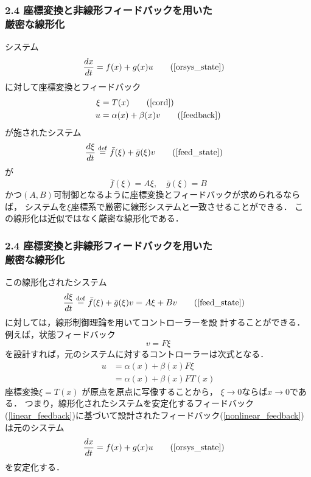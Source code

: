 \begin{frame}[t]
\frametitle{2.4 座標変換と非線形フィードバックを用いた\\
厳密な線形化}
システム
\begin{align}
 \frac{dx}{dt} &= f(x) + g(x) u \tag{\ref{orsys_state}}
 \end{align}
に対して座標変換とフィードバック
\begin{align}
 \xi &= T(x) \tag{\ref{cord}} \\
 u   &= \alpha (x) + \beta (x) v
  \tag{\ref{feedback}}
\end{align}
が施されたシステム
\begin{align}
 \frac{d \xi}{dt} 
 &\defeq \bar{f}(\xi) + \bar{g}(\xi) v
  \tag{\ref{feed_state}}
\end{align}
が
\begin{equation}
 \bar{f}(\xi) = A \xi, \quad \bar{g}(\xi) = B 
  \label{linear}
\end{equation}
かつ$(A, B)$可制御となるように座標変換とフィードバックが求められるならば，
システムを$\xi$座標系で厳密に線形システムと一致させることができる．
この線形化は近似ではなく厳密な線形化である．
\end{frame}

\begin{frame}[t]
\frametitle{2.4 座標変換と非線形フィードバックを用いた\\
厳密な線形化}
この線形化されたシステム
\begin{align}
 \frac{d \xi}{dt} 
 &\defeq \bar{f}(\xi) + \bar{g}(\xi) v = A\xi + Bv
  \tag{\ref{feed_state}}
\end{align}
に対しては，線形制御理論を用いてコントローラーを設
計することができる．\\
例えば，状態フィードバック
\begin{equation}
 v = F \xi
  \label{linear_feedback}
\end{equation}
を設計すれば，元のシステムに対するコントローラーは次式となる．
\begin{align}
 u &= \alpha(x) + \beta(x) F \xi \nonumber \\
   &= \alpha(x) + \beta(x) F T(x)
    \label{nonlinear_feedback}
\end{align}
座標変換$\xi = T(x)$ が原点を原点に写像することから，
$\xi
\rightarrow 0$ならば$x \rightarrow 0$である．
つまり，線形化されたシステムを安定化するフィードバック(\ref{linear_feedback})に基づいて設計されたフィードバック(\ref{nonlinear_feedback})は元のシステム
\begin{align}
 \frac{dx}{dt} &= f(x) + g(x) u \tag{\ref{orsys_state}}
 \end{align}
 を安定化する．
\end{frame}

